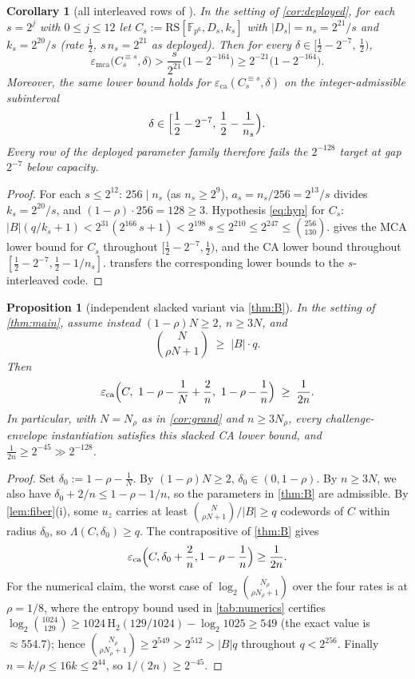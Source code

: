 \documentclass[11pt]{article}
\newtheorem{proposition}[theorem]{Proposition}
\newtheorem{corollary}[theorem]{Corollary}
\theoremstyle{definition}
\theoremstyle{remark}
\newcommand{\F}{\mathbb{F}}
\newcommand{\B}{B}
\newcommand{\RS}{\mathrm{RS}}
\newcommand{\eca}{\varepsilon_{\mathrm{ca}}}
\newcommand{\emca}{\varepsilon_{\mathrm{mca}}}
\newcommand{\Lst}{\Lambda}
\newcommand{\Hb}{\mathrm{H}_2}
\begin{document}
\begin{corollary}[all interleaved rows of {\cite[Tables 2--3]{ABF26}}]\label{cor:rows}
In the setting of \cref{cor:deployed}, for each $s=2^j$ with $0\le j\le12$ let $C_s:=\RS[\F_{p^6},D_s,k_s]$ with $|D_s|=n_s=2^{21}/s$ and $k_s=2^{20}/s$ (rate $\frac12$, $s\,n_s=2^{21}$ as deployed). Then for every $\delta\in\bigl[\frac12-2^{-7},\,\frac12\bigr)$,
\[
\emca\bigl(C_s^{\equiv s},\delta\bigr)
>
\frac s{2^{21}}\bigl(1-2^{-164}\bigr)
\ge
2^{-21}\bigl(1-2^{-164}\bigr).
\]
Moreover, the same lower bound holds for $\eca(C_s^{\equiv s},\delta)$ on the integer-admissible subinterval
\[
        \delta\in
        \Bigl[\frac12-2^{-7},\,\frac12-\frac1{n_s}\Bigr).
\]
Every row of the deployed parameter family therefore fails the $2^{-128}$ target at gap $2^{-7}$ below capacity.
\end{corollary}

\begin{proof}
For each $s\le2^{12}$: $256\mid n_s$ (as $n_s\ge2^9$), $a_s=n_s/256=2^{13}/s$ divides $k_s=2^{20}/s$, and $(1-\rho)\cdot256=128\ge3$. Hypothesis \eqref{eq:hyp} for $C_s$: $|\B|(q/k_s+1)<2^{31}(2^{166}\,s+1)<2^{198}\,s\le2^{210}\le2^{247}\le\binom{256}{130}$.  gives the MCA lower bound for $C_s$ throughout $[\frac12-2^{-7},\frac12)$, and the CA lower bound throughout $[\frac12-2^{-7},\frac12-1/n_s]$.  transfers the corresponding lower bounds to the $s$-interleaved code.
\end{proof}

\begin{proposition}[independent slacked variant via \cref{thm:B}]\label{prop:slacked}
In the setting of \cref{thm:main}, assume instead $(1-\rho)N\ge2$, $n\ge3N$, and
\[
\binom{N}{\rho N+1}\;\ge\;|\B|\cdot q .
\]
Then
\[
\eca\Bigl(C,\ 1-\rho-\frac1N+\frac2n,\ 1-\rho-\frac1n\Bigr)\;\ge\;\frac1{2n}.
\]
In particular, with $N=N_\rho$ as in \cref{cor:grand} and $n\ge3N_\rho$, every challenge-envelope instantiation satisfies this slacked CA lower bound, and $\frac1{2n}\ge2^{-45}\gg2^{-128}$.
\end{proposition}

\begin{proof}
Set $\delta_0:=1-\rho-\frac1N$. By $(1-\rho)N\ge2$, $\delta_0\in(0,1-\rho)$. By $n\ge3N$, we also have $\delta_0+2/n\le1-\rho-1/n$, so the parameters in \cref{thm:B} are admissible. By \cref{lem:fiber}(i), some $u_z$ carries at least $\binom N{\rho N+1}/|\B|\ge q$ codewords of $C$ within radius $\delta_0$, so $\Lst(C,\delta_0)\ge q$. The contrapositive of \cref{thm:B} gives
\[
\eca\Bigl(C,\delta_0+\frac2n,1-\rho-\frac1n\Bigr)\ge\frac1{2n}.
\]
For the numerical claim, the worst case of $\log_2\binom{N_\rho}{\rho N_\rho+1}$ over the four rates is at $\rho=1/8$, where the entropy bound used in \cref{tab:numerics} certifies $\log_2\binom{1024}{129}\ge1024\,\Hb(129/1024)-\log_2 1025\ge549$ (the exact value is $\approx554.7$); hence $\binom{N_\rho}{\rho N_\rho+1}\ge2^{549}>2^{512}>|\B|q$ throughout $q<2^{256}$. Finally $n=k/\rho\le16k\le2^{44}$, so $1/(2n)\ge2^{-45}$.
\end{proof}
\end{document}
